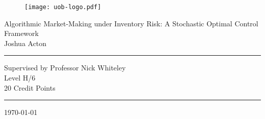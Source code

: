 \thispagestyle{plain}
\begin{titlepage}
    \begin{figure}[h]
        \begin{center}
            \texttt{[image: uob-logo.pdf]} 
        \end{center}
    \end{figure}

    \begin{center}
        {\Large Algorithmic Market-Making under Inventory Risk: A Stochastic Optimal Control Framework\\ \vspace{1cm}Joshua Acton}
    \end{center}

    \vspace{3cm}
    \hrule
    \begin{center}
        Supervised by Professor Nick Whiteley\\
        Level H/6\\
        20 Credit Points
    \end{center}
    \hrule

    \vspace{3cm}
    \begin{center}
        \today
    \end{center}
\end{titlepage}